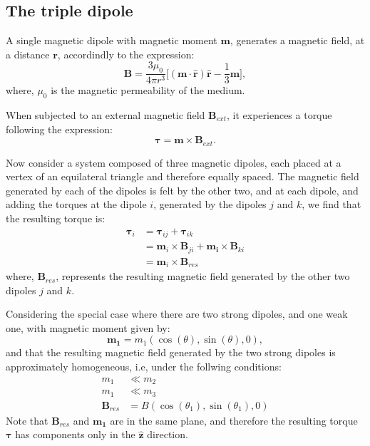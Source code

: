 
\subsection{The triple dipole}
A single magnetic dipole with magnetic moment $\boldsymbol{m}$, generates a magnetic field, at a distance $\boldsymbol{r}$, accordindly to the expression: 
\begin{equation}
    \boldsymbol{B} = \dfrac{3\mu_0}{4 \pi r^3}\bigg[ (\boldsymbol{m \cdot \hat{r}})\boldsymbol{\hat{r}} - \dfrac{1}{3}\boldsymbol{m} \bigg],
    \label{eq:MagneticFieldDipole}
\end{equation}
where, $\mu_0$ is the magnetic permeability of the medium. 

When subjected to an external magnetic field $\boldsymbol{B}_{ext}$, it experiences a torque following the expression: 
\begin{equation}
    \boldsymbol{\tau} = \boldsymbol{m} \times \boldsymbol{B}_{ext}.
    \label{eq:NewtonSecondLaw}
\end{equation}

Now consider a system composed of three magnetic dipoles, each placed at a vertex of an equilateral triangle and therefore equally spaced. The magnetic field generated by each of the dipoles is felt by the other two, and at each dipole, and adding the torques at the dipole $i$, generated by the dipoles $j$ and $k$, we find that the resulting torque is:
\begin{equation}
    \begin{aligned}
        \boldsymbol{\tau}_i &= \boldsymbol{\tau}_{ij} + \boldsymbol{\tau}_{ik}\\
            & =  \boldsymbol{m}_i \times \boldsymbol{B}_{j i}+\boldsymbol{m_i} \times \boldsymbol{B}_{k i}\\
            &= \boldsymbol{m}_i \times \boldsymbol{B}_{res}
    \end{aligned}
    \label{eq:Torques}
\end{equation}
where, $\boldsymbol{B}_{res}$, represents the resulting magnetic field generated by the other two dipoles $j$ and $k$. 

Considering the special case where there are two strong dipoles, and one weak one, with magnetic moment given by:
\begin{equation}
    \boldsymbol{m_1} = m_1 (\cos(\theta), \sin(\theta), 0),
\end{equation}
and that the resulting magnetic field generated by the two strong dipoles is approximately homogeneous, i.e, under the follwing conditions:
\begin{equation}
    \begin{aligned}
        m_1 & \ll m_2\\
        m_1 & \ll m_3\\
        \boldsymbol{B}_{res} &= B(\cos(\theta_1),\sin(\theta_1), 0)
    \end{aligned}
    \label{eq:Hipotesys}
\end{equation}
Note that $\boldsymbol{B}_{res}$ and $\boldsymbol{m_1}$ are in the same plane, and therefore the resulting torque $\boldsymbol{\tau}$ has components only in the $\boldsymbol{\hat{z}}$ direction. 

